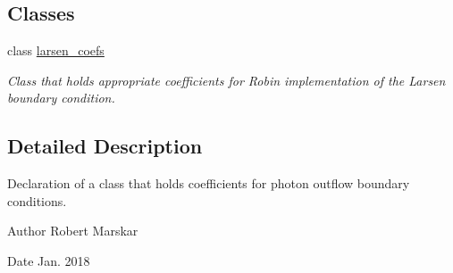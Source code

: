 \subsection*{Classes}
\begin{DoxyCompactItemize}
\item 
class \hyperlink{classlarsen__coefs}{larsen\+\_\+coefs}
\begin{DoxyCompactList}\small\item\em Class that holds appropriate coefficients for Robin implementation of the Larsen boundary condition. \end{DoxyCompactList}\end{DoxyCompactItemize}


\subsection{Detailed Description}
Declaration of a class that holds coefficients for photon outflow boundary conditions. 

\begin{DoxyAuthor}{Author}
Robert Marskar 
\end{DoxyAuthor}
\begin{DoxyDate}{Date}
Jan. 2018 
\end{DoxyDate}
